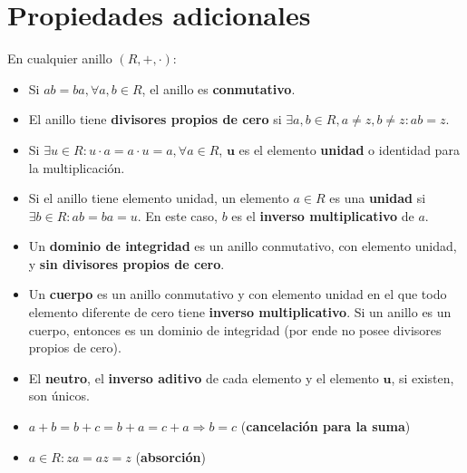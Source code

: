 \documentclass[12pt]{article}
\begin{document}
\section*{Propiedades adicionales}

\begin{tcolorbox}[title=Propiedades importantes]
En cualquier anillo \( (R, +, \cdot) \):
\begin{itemize}
    \item Si \( ab = ba, \forall a, b \in R \), el anillo es \textbf{conmutativo}.
    \item El anillo tiene \textbf{divisores propios de cero} si \( \exists a, b \in R, a \neq z, b \neq z : ab = z \).
    \item Si \( \exists u \in R : u \cdot a = a \cdot u = a, \forall a \in R \), \(\boldsymbol{u}\) es el elemento \textbf{unidad} o identidad para la multiplicación.
    \item Si el anillo tiene elemento unidad, un elemento \( a \in R \) es una \textbf{unidad} si \( \exists b \in R : ab = ba = u \). En este caso, \( b \) es el \textbf{inverso multiplicativo} de \( a \).
    \item Un \textbf{dominio de integridad} es un anillo conmutativo, con elemento unidad, y \textbf{sin divisores propios de cero}.
    \item Un \textbf{cuerpo} es un anillo conmutativo y con elemento unidad en el que todo elemento diferente de cero tiene \textbf{inverso multiplicativo}. Si un anillo es un cuerpo, entonces es un dominio de integridad (por ende no posee divisores propios de cero).
\end{itemize}
\end{tcolorbox}

\begin{tcolorbox}[colback=yellow!15, title=Nota]
\begin{itemize}
    \item El \textbf{neutro}, el \textbf{inverso aditivo} de cada elemento y el elemento \(\boldsymbol{u}\), si existen, son únicos. 
\end{itemize}
\end{tcolorbox}

\begin{tcolorbox}[title=Leyes de cancelación para la suma y absorción]
\begin{itemize}
    \item  \( a + b = b + c = b + a = c + a \Rightarrow b = c \) (\textbf{cancelación para la suma})
    \item \( a \in R : za = az = z \) (\textbf{absorción})
\end{itemize}
\end{tcolorbox}
\end{document}

